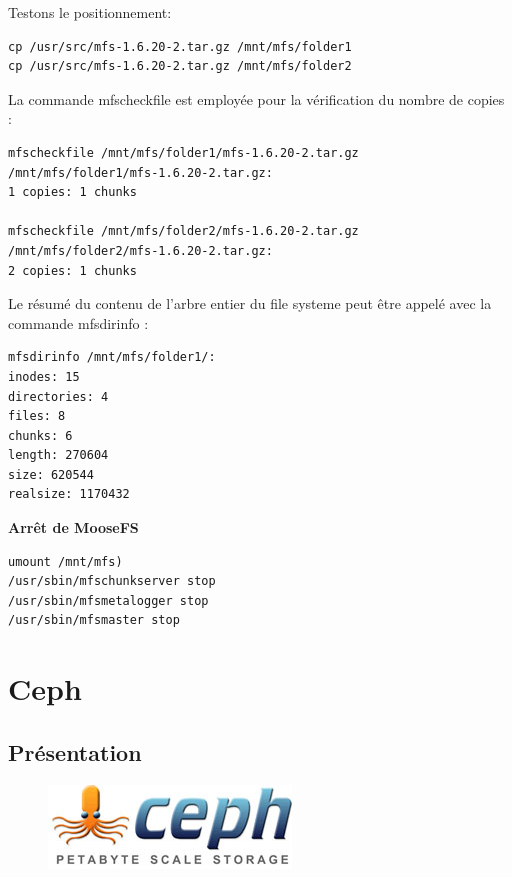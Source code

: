 \documentclass[12pt]{report}
\begin{document}
Testons le positionnement:
\begin{lstlisting}
cp /usr/src/mfs-1.6.20-2.tar.gz /mnt/mfs/folder1
cp /usr/src/mfs-1.6.20-2.tar.gz /mnt/mfs/folder2
	  \end{lstlisting}
La commande mfscheckfile est employée pour la vérification du nombre de copies :
\begin{lstlisting}
mfscheckfile /mnt/mfs/folder1/mfs-1.6.20-2.tar.gz
/mnt/mfs/folder1/mfs-1.6.20-2.tar.gz:
1 copies: 1 chunks

mfscheckfile /mnt/mfs/folder2/mfs-1.6.20-2.tar.gz
/mnt/mfs/folder2/mfs-1.6.20-2.tar.gz:
2 copies: 1 chunks
	  \end{lstlisting}
Le résumé du contenu de l'arbre entier du file systeme peut être appelé avec la commande mfsdirinfo :
\begin{lstlisting}
mfsdirinfo /mnt/mfs/folder1/:
inodes: 15
directories: 4
files: 8
chunks: 6
length: 270604
size: 620544
realsize: 1170432
	  \end{lstlisting}
\textbf{Arrêt de MooseFS}\\
\begin{lstlisting}
umount /mnt/mfs)
/usr/sbin/mfschunkserver stop
/usr/sbin/mfsmetalogger stop
/usr/sbin/mfsmaster stop
	  \end{lstlisting}

	\chapter{Ceph}
		\section{Présentation}

                        \begin{figure}[H]
				\begin{center}
					\includegraphics[width=0.40\linewidth]{images/cephfs.jpg}
				\end{center}
			\end{figure}
\end{document}
